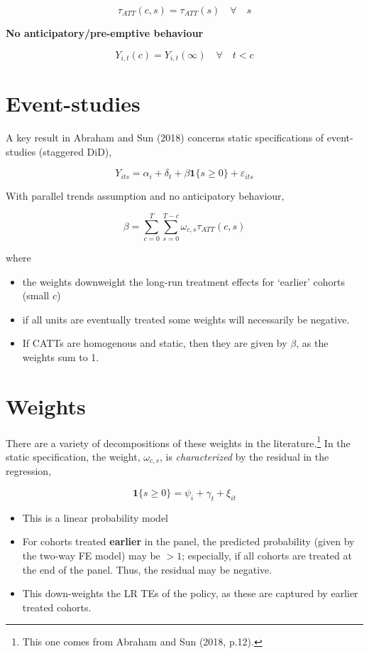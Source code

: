 \documentclass[
  letterpaper,
  DIV=11,
  numbers=noendperiod]{scrreprt}
\providecommand{\tightlist}{%
  \setlength{\itemsep}{0pt}\setlength{\parskip}{0pt}}\usepackage{longtable,booktabs,array}
\theoremstyle{definition}
\theoremstyle{remark}
\begin{document}
\[
\tau_{ATT}(c,s) = \tau_{ATT}(s)\quad \forall\quad s
\]

\leavevmode{}%
\textbf{No anticipatory/pre-emptive behaviour}

\[
Y_{i,t}(c) = Y_{i,t}(\infty)\quad \forall\quad t<c
\]

\hypertarget{event-studies}{%
\section{Event-studies}\label{event-studies}}

A key result in Abraham and Sun (2018) concerns static specifications of
event-studies (staggered DiD),

\[
Y_{its} = \alpha_i + \delta_t + \beta \mathbf{1}\{s\geq 0\} + \varepsilon_{its}
\]

With parallel trends assumption and no anticipatory behaviour,

\[
\beta = \sum_{c=0}^T\sum_{s= 0}^{T-c}\omega_{c,s} \tau_{ATT}(c,s)
\]

where

\begin{itemize}
\tightlist
\item
  the weights downweight the long-run treatment effects for `earlier'
  cohorts (small \(c\))
\item
  if all units are eventually treated some weights will necessarily be
  negative.
\item
  If CATTs are homogenous and static, then they are given by \(\beta\),
  as the weights sum to 1.
\end{itemize}

\hypertarget{weights}{%
\section{Weights}\label{weights}}

There are a variety of decompositions of these weights in the
literature.\footnote{This one comes from Abraham and Sun (2018, p.12).}
In the static specification, the weight, \(\omega_{c,s}\), is
\emph{characterized} by the residual in the regression,

\[
\mathbf{1}\{s\geq 0\} = \psi_i + \gamma_t + \xi_{it}
\]

\begin{itemize}
\tightlist
\item
  This is a linear probability model
\item
  For cohorts treated \textbf{earlier} in the panel, the predicted
  probability (given by the two-way FE model) may be \(>1\); especially,
  if all cohorts are treated at the end of the panel. Thus, the residual
  may be negative.
\item
  This down-weights the LR TEs of the policy, as these are captured by
  earlier treated cohorts.
\end{itemize}
\end{document}
